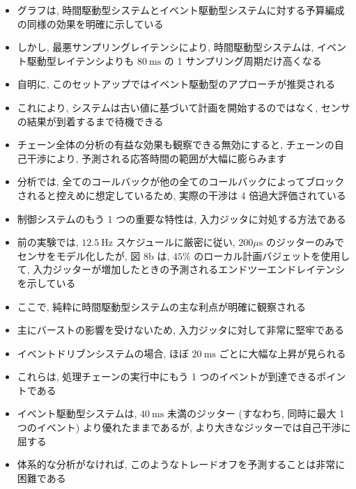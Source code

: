 \begin{frame}{}
    \begin{itemize}
        \item グラフは, 時間駆動型システムとイベント駆動型システムに対する予算編成の同様の効果を明確に示している
\item しかし, 最悪サンプリングレイテンシにより, 時間駆動型システムは, イベント駆動型レイテンシよりも $80 \mathrm{~ms}$ の 1 サンプリング周期だけ高くなる
\item 自明に, このセットアップではイベント駆動型のアプローチが推奨される
\item これにより, システムは古い値に基づいて計画を開始するのではなく, センサの結果が到着するまで待機できる
\item チェーン全体の分析の有益な効果も観察できる無効にすると, チェーンの自己干渉により, 予測される応答時間の範囲が大幅に膨らみます
\item 分析では, 全てのコールバックが他の全てのコールバックによってブロックされると控えめに想定しているため, 実際の干渉は 4 倍過大評価されている
    \end{itemize}
\end{frame}

\begin{frame}{}
    \begin{itemize}
        \item 制御システムのもう 1 つの重要な特性は, 入力ジッタに対処する方法である
\item 前の実験では, $12.5 \mathrm{~Hz}$ スケジュールに厳密に従い, $200 \mu \mathrm{s}$ のジッターのみでセンサをモデル化したが, 図 8b は, $45 \%$ のローカル計画バジェットを使用して, 入力ジッターが増加したときの予測されるエンドツーエンドレイテンシを示している
\item ここで, 純粋に時間駆動型システムの主な利点が明確に観察される
\item 主にバーストの影響を受けないため, 入力ジッタに対して非常に堅牢である
\item イベントドリブンシステムの場合, ほぼ $20 \mathrm{~ms}$ ごとに大幅な上昇が見られる
\item これらは, 処理チェーンの実行中にもう 1 つのイベントが到達できるポイントである
\item イベント駆動型システムは, $40 \mathrm{~ms}$ 未満のジッター (すなわち, 同時に最大 1 つのイベント) より優れたままであるが, より大きなジッターでは自己干渉に屈する
\item 体系的な分析がなければ, このようなトレードオフを予測することは非常に困難である
    \end{itemize}
\end{frame}

